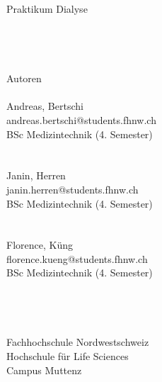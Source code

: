 
\\\\
Praktikum Dialyse\\\\\\\\\\
{\Large Autoren}\\\\
Andreas, Bertschi\\
andreas.bertschi@students.fhnw.ch\\
BSc Medizintechnik (4. Semester)\\\\\\
Janin, Herren\\
janin.herren@students.fhnw.ch\\
BSc Medizintechnik (4. Semester)\\\\\\
Florence, Küng\\
florence.kueng@students.fhnw.ch\\
BSc Medizintechnik (4. Semester)\\\\\\


\\\\
Fachhochschule Nordwestschweiz\\
Hochschule für Life Sciences\\
Campus Muttenz